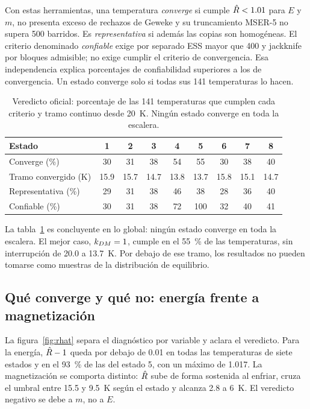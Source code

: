 Con estas herramientas, una temperatura \emph{converge} si cumple $\hat R<1.01$ para $E$ y $m$, no presenta exceso de rechazos de Geweke y su truncamiento MSER-5 no supera 500 barridos. Es \emph{representativa} si además las copias son homogéneas. El criterio denominado \emph{confiable} exige por separado ESS mayor que 400 y jackknife por bloques admisible; no exige cumplir el criterio de convergencia. Esa independencia explica porcentajes de confiabilidad superiores a los de convergencia. Un estado converge solo si todas sus 141 temperaturas lo hacen.

\begin{table}[H]
\centering\small
\caption{Veredicto oficial: porcentaje de las 141 temperaturas que cumplen cada criterio y tramo continuo desde 20~K. Ningún estado converge en toda la escalera.}
\label{tab:veredicto}
\begin{tabular}{lcccccccc}
\toprule
Estado & 1 & 2 & 3 & 4 & 5 & 6 & 7 & 8\\
\midrule
Converge (\%) & 30 & 31 & 38 & 54 & 55 & 30 & 38 & 40\\
Tramo convergido (K) & 15.9 & 15.7 & 14.7 & 13.8 & 13.7 & 15.8 & 15.1 & 14.7\\
Representativa (\%) & 29 & 31 & 38 & 46 & 38 & 28 & 36 & 40\\
Confiable (\%) & 30 & 31 & 38 & 72 & 100 & 32 & 40 & 41\\
\bottomrule
\end{tabular}
\end{table}

La tabla~\ref{tab:veredicto} es concluyente en lo global: ningún estado converge en toda la escalera. El mejor caso, $k_{DM}=1$, cumple en el 55~\% de las temperaturas, sin interrupción de 20.0 a 13.7~K. Por debajo de ese tramo, los resultados no pueden tomarse como muestras de la distribución de equilibrio.

\subsection{Qué converge y qué no: energía frente a magnetización}

La figura~\ref{fig:rhat} separa el diagnóstico por variable y aclara el veredicto. Para la energía, $\hat R-1$ queda por debajo de 0.01 en todas las temperaturas de siete estados y en el 93~\% de las del estado 5, con un máximo de 1.017. La magnetización se comporta distinto: $\hat R$ sube de forma sostenida al enfriar, cruza el umbral entre 15.5 y 9.5~K según el estado y alcanza 2.8 a 6~K. El veredicto negativo se debe a $m$, no a $E$.

